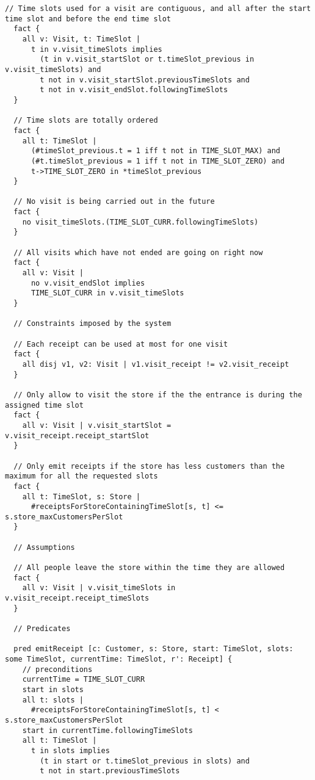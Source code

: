 \documentclass[../../main.tex]{subfiles}
\begin{document}
\begin{lstlisting}[language=alloy]
  // Time slots used for a visit are contiguous, and all after the start time slot and before the end time slot
  fact {
    all v: Visit, t: TimeSlot |
      t in v.visit_timeSlots implies 
        (t in v.visit_startSlot or t.timeSlot_previous in v.visit_timeSlots) and
        t not in v.visit_startSlot.previousTimeSlots and
        t not in v.visit_endSlot.followingTimeSlots
  }
  
  // Time slots are totally ordered
  fact {
    all t: TimeSlot | 
      (#timeSlot_previous.t = 1 iff t not in TIME_SLOT_MAX) and
      (#t.timeSlot_previous = 1 iff t not in TIME_SLOT_ZERO) and
      t->TIME_SLOT_ZERO in *timeSlot_previous
  }
  
  // No visit is being carried out in the future
  fact {
    no visit_timeSlots.(TIME_SLOT_CURR.followingTimeSlots)
  }
  
  // All visits which have not ended are going on right now
  fact {
    all v: Visit |
      no v.visit_endSlot implies
      TIME_SLOT_CURR in v.visit_timeSlots
  }
  
  // Constraints imposed by the system
  
  // Each receipt can be used at most for one visit
  fact {
    all disj v1, v2: Visit | v1.visit_receipt != v2.visit_receipt
  }
  
  // Only allow to visit the store if the the entrance is during the assigned time slot
  fact {
    all v: Visit | v.visit_startSlot = v.visit_receipt.receipt_startSlot
  }
  
  // Only emit receipts if the store has less customers than the maximum for all the requested slots
  fact {
    all t: TimeSlot, s: Store |
      #receiptsForStoreContainingTimeSlot[s, t] <= s.store_maxCustomersPerSlot
  }
  
  // Assumptions
  
  // All people leave the store within the time they are allowed
  fact {
    all v: Visit | v.visit_timeSlots in v.visit_receipt.receipt_timeSlots
  }
  
  // Predicates
  
  pred emitReceipt [c: Customer, s: Store, start: TimeSlot, slots: some TimeSlot, currentTime: TimeSlot, r': Receipt] {
    // preconditions
    currentTime = TIME_SLOT_CURR
    start in slots
    all t: slots |
      #receiptsForStoreContainingTimeSlot[s, t] < s.store_maxCustomersPerSlot
    start in currentTime.followingTimeSlots
    all t: TimeSlot |
      t in slots implies
        (t in start or t.timeSlot_previous in slots) and
        t not in start.previousTimeSlots
    

\end{lstlisting}
\end{document}
